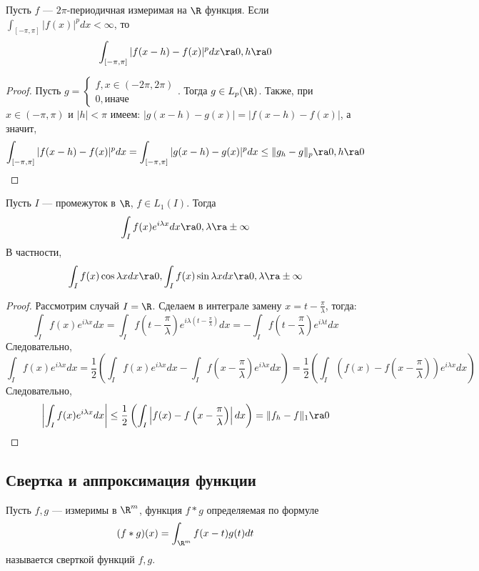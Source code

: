\begin{corollary}
    Пусть \(f\) --- \(2\pi\)-периодичная измеримая на \(\R\) функция. Если \(\int_{[-\pi, \pi]} |f(x)|^p dx < \infty\), то 
    \[\int_{[-\pi, \pi]} |f(x - h) - f(x)|^pdx \ra 0, h \ra 0\]
\end{corollary}
\begin{proof}
    Пусть \(g = \left\{\begin{array}{l}
        f, x \in (-2\pi, 2\pi) \\
        0, \text{иначе}
    \end{array}\right.\). Тогда \(g \in L_p(\R)\). Также, при \(x \in (-\pi, \pi)\) и \(|h| < \pi\) имеем: \(|g(x - h) - g(x)| = |f(x - h) - f(x)|\), а значит,
    \[\int_{[-\pi, \pi]} |f(x - h) - f(x)|^pdx = \int_{[-\pi, \pi]} |g(x - h) - g(x)|^pdx \le \|g_h - g\|_p \ra 0, h \ra 0\]
\end{proof}

\begin{theorem}
    Пусть \(I\) --- промежуток в \(\R\), \(f \in L_1(I)\). Тогда 
    \[\int_I f(x)e^{i\lambda x}dx \ra 0, \lambda \ra \pm\infty\]
    В частности, 
    \[\int_I f(x)\cos\lambda xdx \ra 0, \int_I f(x)\sin \lambda xdx \ra 0, \lambda \ra \pm\infty\]
\end{theorem}
\begin{proof}
    Рассмотрим случай \(I = \R\). Сделаем в интеграле замену \(x = t - \frac{\pi}{\lambda}\), тогда:
    \[\int_I f(x)e^{i\lambda x}dx = \int_I f\left( t - \frac{\pi}{\lambda} \right)e^{i\lambda \left( t - \frac{\pi}{\lambda} \right)}dx = -\int_I f\left( t - \frac{\pi}{\lambda} \right)e^{i\lambda t}dx\]
    Следовательно,
    \[\int_I f(x)e^{i\lambda x}dx = \frac{1}{2}\left(  \int_I f(x)e^{i\lambda x}dx -\int_I f\left( x - \frac{\pi}{\lambda} \right)e^{i\lambda x}dx\right)= \frac{1}{2}\left(  \int_I \left( f(x) - f\left( x - \frac{\pi}{\lambda} \right) \right)e^{i\lambda x}dx\right)\]
    Следовательно, 
    \[\left|\int_I f(x)e^{i\lambda x}dx\right| \le \frac{1}{2}\left(  \int_I \left| f(x) - f\left( x - \frac{\pi}{\lambda} \right) \right|dx\right) = \|f_h - f\|_1 \ra 0\]
\end{proof}

\subsection{Свертка и аппроксимация функции}
\begin{definition}
    Пусть \(f, g\) --- измеримы в \(\R^m\), функция \(f * g\) определяемая по формуле
    \[(f * g)(x) = \int_{\R^m} f(x - t)g(t)dt\]
    называется сверткой функций \(f, g\).
\end{definition}

